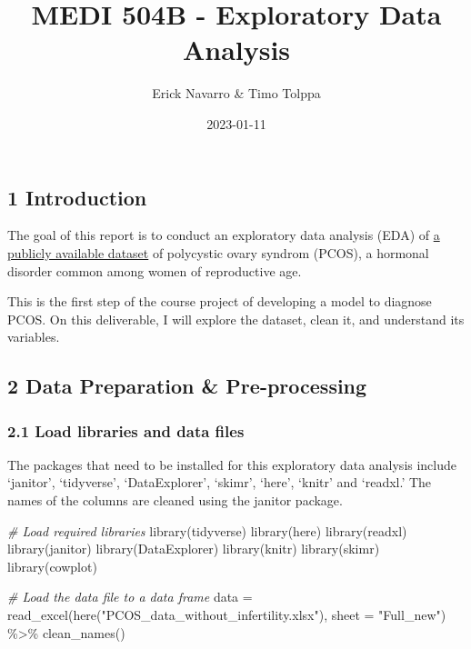 \documentclass[
]{article}
\title{MEDI 504B - Exploratory Data Analysis}
\author{Erick Navarro \& Timo Tolppa}
\date{2023-01-11}
\newenvironment{Shaded}{\begin{snugshade}}{\end{snugshade}}
\newcommand{\AttributeTok}[1]{\textcolor[rgb]{0.77,0.63,0.00}{#1}}
\newcommand{\CommentTok}[1]{\textcolor[rgb]{0.56,0.35,0.01}{\textit{#1}}}
\newcommand{\FunctionTok}[1]{\textcolor[rgb]{0.00,0.00,0.00}{#1}}
\newcommand{\NormalTok}[1]{#1}
\newcommand{\OtherTok}[1]{\textcolor[rgb]{0.56,0.35,0.01}{#1}}
\newcommand{\SpecialCharTok}[1]{\textcolor[rgb]{0.00,0.00,0.00}{#1}}
\newcommand{\StringTok}[1]{\textcolor[rgb]{0.31,0.60,0.02}{#1}}
\begin{document}
\maketitle

{
\setcounter{tocdepth}{4}
\tableofcontents
}
\hypertarget{introduction}{%
\subsection{1 Introduction}\label{introduction}}

The goal of this report is to conduct an exploratory data analysis (EDA)
of
\href{https://www.kaggle.com/datasets/prasoonkottarathil/polycystic-ovary-syndrome-pcos?resource=download}{a
publicly available dataset} of polycystic ovary syndrom (PCOS), a
hormonal disorder common among women of reproductive age.

This is the first step of the course project of developing a model to
diagnose PCOS. On this deliverable, I will explore the dataset, clean
it, and understand its variables.

\hypertarget{data-preparation-pre-processing}{%
\subsection{2 Data Preparation \&
Pre-processing}\label{data-preparation-pre-processing}}

\hypertarget{load-libraries-and-data-files}{%
\subsubsection{2.1 Load libraries and data
files}\label{load-libraries-and-data-files}}

The packages that need to be installed for this exploratory data
analysis include `janitor', `tidyverse', `DataExplorer', `skimr',
`here', `knitr' and `readxl.' The names of the columns are cleaned using
the janitor package.

\begin{Shaded}
\begin{Highlighting}[]
\CommentTok{\# Load required libraries}
\FunctionTok{library}\NormalTok{(tidyverse)}
\FunctionTok{library}\NormalTok{(here)}
\FunctionTok{library}\NormalTok{(readxl)}
\FunctionTok{library}\NormalTok{(janitor)}
\FunctionTok{library}\NormalTok{(DataExplorer)}
\FunctionTok{library}\NormalTok{(knitr)}
\FunctionTok{library}\NormalTok{(skimr)}
\FunctionTok{library}\NormalTok{(cowplot)}

\CommentTok{\# Load the data file to a data frame}
\NormalTok{data }\OtherTok{=} \FunctionTok{read\_excel}\NormalTok{(}\FunctionTok{here}\NormalTok{(}\StringTok{"PCOS\_data\_without\_infertility.xlsx"}\NormalTok{), }\AttributeTok{sheet =} \StringTok{"Full\_new"}\NormalTok{) }\SpecialCharTok{\%\textgreater{}\%} 
  \FunctionTok{clean\_names}\NormalTok{()}
\end{Highlighting}
\end{Shaded}
\end{document}
